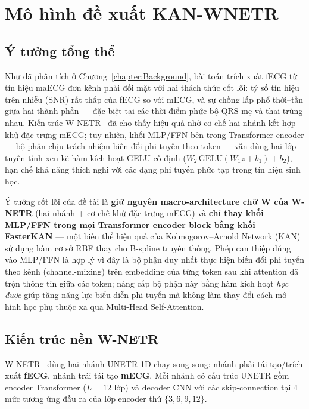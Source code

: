 \documentclass[../DoAn.tex]{subfiles}
\begin{document}
\section{Mô hình đề xuất KAN-WNETR}
\label{sec:kanwnetr}

\subsection{Ý tưởng tổng thể}

Như đã phân tích ở Chương~\ref{chapter:Background}, bài toán trích xuất fECG từ tín hiệu maECG đơn kênh phải đối mặt với hai thách thức cốt lõi: tỷ số tín hiệu trên nhiễu (SNR) rất thấp của fECG so với mECG, và sự chồng lấp phổ thời--tần giữa hai thành phần --- đặc biệt tại các thời điểm phức bộ QRS mẹ và thai trùng nhau. Kiến trúc W-NETR~\cite{almadaniOneDimensionalWNETRNonInvasive2023} đã cho thấy hiệu quả nhờ cơ chế hai nhánh kết hợp khử đặc trưng mECG; tuy nhiên, khối MLP/FFN bên trong Transformer encoder --- bộ phận chịu trách nhiệm biến đổi phi tuyến theo token --- vẫn dùng hai lớp tuyến tính xen kẽ hàm kích hoạt GELU cố định ($W_2\,\mathrm{GELU}(W_1 z + b_1) + b_2$), hạn chế khả năng thích nghi với các dạng phi tuyến phức tạp trong tín hiệu sinh học.

Ý tưởng cốt lõi của đề tài là \textbf{giữ nguyên macro-architecture chữ W của W-NETR} (hai nhánh + cơ chế khử đặc trưng mECG) và \textbf{chỉ thay khối MLP/FFN trong mọi Transformer encoder block bằng khối FasterKAN} --- một biến thể hiệu quả của Kolmogorov--Arnold Network (KAN)~\cite{liuKANKolmogorovArnoldNetworks2025} sử dụng hàm cơ sở RBF thay cho B-spline truyền thống. Phép can thiệp đúng vào MLP/FFN là hợp lý vì đây là bộ phận duy nhất thực hiện biến đổi phi tuyến theo kênh (channel-mixing) trên embedding của từng token sau khi attention đã trộn thông tin giữa các token; nâng cấp bộ phận này bằng hàm kích hoạt \emph{học được} giúp tăng năng lực biểu diễn phi tuyến mà không làm thay đổi cách mô hình học phụ thuộc xa qua Multi-Head Self-Attention.

\subsection{Kiến trúc nền W-NETR}

W-NETR~\cite{almadaniOneDimensionalWNETRNonInvasive2023} dùng hai nhánh UNETR 1D chạy song song: nhánh phải tái tạo/trích xuất \textbf{fECG}, nhánh trái tái tạo \textbf{mECG}. Mỗi nhánh có cấu trúc UNETR gồm encoder Transformer ($L = 12$ lớp) và decoder CNN với các skip-connection tại 4 mức tương ứng đầu ra của lớp encoder thứ $\{3, 6, 9, 12\}$.
\end{document}

